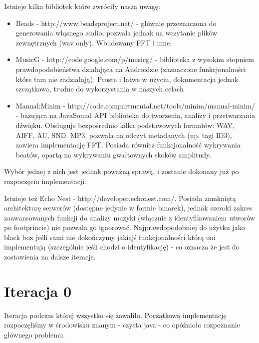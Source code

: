 \begin{Note}
Istnieje kilka bibliotek które zwróciły naszą uwagę:
\begin{itemize}
    \item Beads - http://www.beadsproject.net/ - głównie przeznaczona do generowania włąsnego audio, pozwala jednak na wczytanie plików zewnętrznych (wav only). Wbudowany FFT i inne.
    \item MusicG - http://code.google.com/p/musicg/ - biblioteka z wysokim stopniem prawdopodobieństwa działająca na Androidzie (zaznaczone funkcjonalności które tam nie zadziałają). Proste i łatwe w użyciu, dokumentacja jednak szczątkowa, trudne do wykorzystania w naszych celach
    \item Manual:Minim - http://code.compartmental.net/tools/minim/manual-minim/ - bazująca na JavaSound API biblioteka do tworzenia, analizy i przetwarzania dźwięku. Obsługuje bezpośrednio kilka podstawowych formatów: WAV, AIFF, AU, SND, MP3, pozwala na odczyt metadanych (np. tagi ID3), zawiera implementację FFT. Posiada również funkcjonalność wykrywania beatów, opartą na wykrywaniu gwałtownych skoków amplitudy.
\end{itemize}

Wybór jednej z nich jest jednak poważną sprawą, i zostanie dokonany już po rozpoczęciu implementacji.

Istnieje też Echo Nest - http://developer.echonest.com/. Posiada zamkniętą architekturę serwerów (dostępne jedynie w formie binarek), jednak szeroki zakres zaawansowanych funkcji do analizy muzyki (włącznie z identyfikowaniem utworów po footprincie) nie pozwala go ignorować. Najprawdopodobniej do użytku jako black box jeśli sami nie dokończymy jakiejś funkcjonalności którą oni implementują (szczególnie jeśli chodzi o identyfikację) - co oznacza że jest do zostawienia na dalsze iteracje.
\end{Note}

\section{Iteracja 0}
Iteracja podczas której wszystko się zawaliło. Początkową implementację rozpoczęliśmy w środowisku znanym - czysta java - co opóźnioło rozpoznanie głównego problemu.

